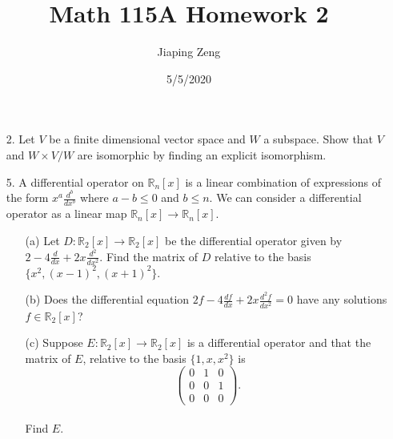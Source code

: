 \documentclass{article}
\title{Math 115A Homework 2}
\date{5/5/2020}
\author{Jiaping Zeng}
\begin{document}
\maketitle

\begin{itemize}
	\item [2.] Let $V$ be a finite dimensional vector space and $W$ a subspace. Show that $V$ and $W \times V/W$ are isomorphic by finding an explicit isomorphism.
	\item [5.] A differential operator on $\mathbb{R}_n[x]$ is a linear combination of expressions of the form $x^a\frac{d^b}{dx^b}$ where $a-b \leq 0$ and $b \leq n$. We can consider a differential operator as a linear map $\mathbb{R}_n[x]\rightarrow\mathbb{R}_n[x]$.
	\begin{itemize}
		\item [(a)] Let $D:\mathbb{R}_2[x]\rightarrow\mathbb{R}_2[x]$ be the differential operator given by $2-4\frac{d}{dx}+2x\frac{d^2}{dx^2}$. Find the matrix of $D$ relative to the basis $\{x^2, (x-1)^2, (x+1)^2\}$.
		\item [(b)] Does the differential equation $2f-4\frac{df}{dx}+2x\frac{d^2f}{dx^2}=0$ have any solutions $f \in \mathbb{R}_2[x]$?
		\item [(c)] Suppose $E:\mathbb{R}_2[x]\rightarrow\mathbb{R}_2[x]$ is a differential operator and that the matrix of $E$, relative to the basis $\{1,x,x^2\}$ is \[\begin{pmatrix}
			0&1&0\\0&0&1\\0&0&0
		\end{pmatrix}.\]\\Find $E$.
	\end{itemize}
\end{itemize}
\end{document}
